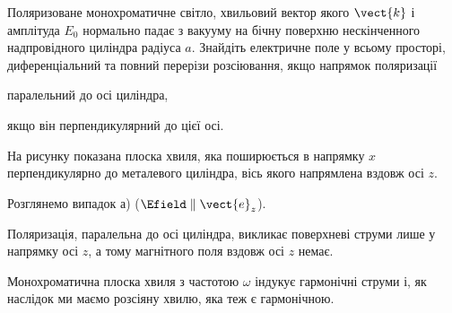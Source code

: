\begin{problem}\label{prb:Zang_metall_Cyllinder}%
Поляризоване монохроматичне світло, хвильовий вектор якого $\vect{k}$  і амплітуда $E_0$ нормально
падає з вакууму на бічну поверхню нескінченного надпровідного циліндра радіуса $a$. Знайдіть
електричне поле у всьому просторі, диференціальний та повний перерізи розсіювання, якщо напрямок
поляризації
\begin{enumerate*}[label=\alph*)]
	\item паралельний до осі циліндра,
	\item якщо він перпендикулярний до цієї осі.
\end{enumerate*}
\begin{solution}
	На рисунку показана плоска хвиля, яка поширюється в напрямку $x$ перпендикулярно до металевого
	циліндра, вісь якого напрямлена вздовж осі $z$.

	\begin{center}
	\end{center}

	Розглянемо випадок а) ($\Efield \parallel \vect{e}_z$).

	Поляризація, паралельна до осі циліндра, викликає поверхневі струми лише у напрямку осі $z$, а
	тому магнітного поля вздовж осі $z$ немає.

	Монохроматична плоска хвиля з частотою $\omega$ індукує  гармонічні струми і, як наслідок ми маємо
	розсіяну хвилю, яка теж є гармонічною.


\end{solution}
\end{problem}
